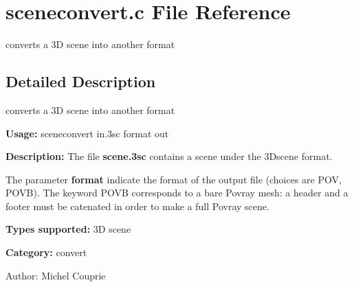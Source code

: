 \section{sceneconvert.c File Reference}
\label{sceneconvert_8c}
converts a 3D scene into another format  




\label{_details}
\subsection{Detailed Description}
converts a 3D scene into another format 

{\bf Usage:} sceneconvert in.3sc format out

{\bf Description:} The file {\bf scene.3sc} contains a scene under the 3Dscene format.

The parameter {\bf format} indicate the format of the output file (choices are POV, POVB). The keyword POVB corresponds to a bare Povray mesh: a header and a footer must be catenated in order to make a full Povray scene.

{\bf Types supported:} 3D scene

{\bf Category:} convert

\begin{Desc}
\item[Author:]Michel Couprie \end{Desc}
